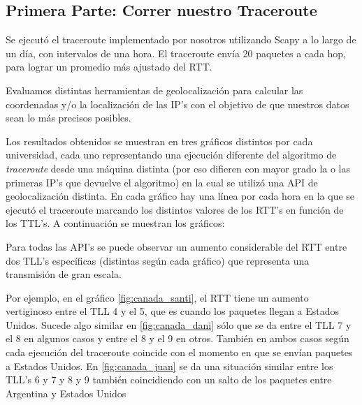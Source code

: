 \subsection{Primera Parte: Correr nuestro Traceroute}

Se ejecutó el traceroute implementado por nosotros utilizando Scapy a lo largo de un día, con intervalos de una hora. El traceroute envía 20 paquetes a cada hop, para lograr un promedio más ajustado del RTT.

Evaluamos distintas herramientas de geolocalización para calcular las coordenadas y/o la localización de las IP's con el objetivo de que nuestros datos sean lo más precisos posibles.


Los resultados obtenidos se muestran en tres gráficos distintos por cada universidad, cada uno representando una ejecución diferente del algoritmo de \textit{traceroute} desde una máquina distinta (por eso difieren con mayor grado la o las primeras IP's que devuelve el algoritmo) en la cual se utilizó una API de geolocalización distinta. En cada gráfico hay una línea por cada hora en la que se ejecutó el traceroute marcando los distintos valores de los RTT's en función de los TTL's. A continuación se muestran los gráficos:

Para todas las API's se puede observar un aumento considerable del RTT entre dos TLL's específicas (distintas según cada gráfico) que representa una transmisión de gran escala.



Por ejemplo, en el gráfico \ref{fig:canada_santi}, el RTT tiene un aumento vertiginoso entre el TLL 4 y el 5, que es cuando los paquetes llegan a Estados Unidos. Sucede algo similar en \ref{fig:canada_dani} sólo que se da entre el TLL 7 y el 8 en algunos casos y entre el 8 y el 9 en otros. También en ambos casos según cada ejecución del traceroute coincide con el momento en que se envían paquetes a Estados Unidos. En \ref{fig:canada_juan} se da una situación similar entre los TLL's 6 y 7 y 8 y 9 también coincidiendo con un salto de los paquetes entre Argentina y Estados Unidos

 


